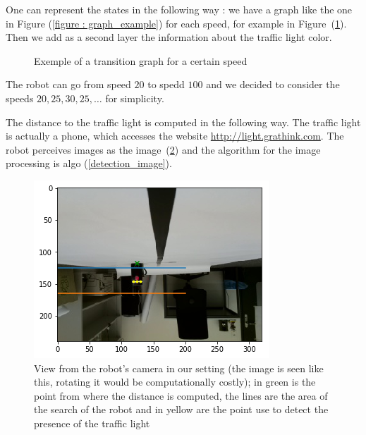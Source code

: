 \documentclass[14pt,a4paper]{article}
\theoremstyle{definition}
\begin{document}
One can represent the states in the following way : we have a graph like the one in Figure  (\ref{figure : graph_example}) for each speed, for example in Figure~(\ref{figure : graph_ex}). Then we add as a second layer the information about the traffic light color.
\begin{figure}[H]
\begin{center}
\end{center}
    \caption{Exemple of a transition graph for a certain speed}
    \label{figure : graph_ex}

\end{figure}


The robot can go from speed $20$ to spedd $100$  and we decided to consider the speeds $20,25,30,25,\ldots$ for simplicity.

The distance to the traffic light is computed in the following way. The traffic light is actually a phone, which accesses the website \url{http://light.grathink.com}. The robot perceives images as the image~(\ref{vue_robot}) and the algorithm for the image processing is algo (\ref{detection_image}).

\begin{figure}
\centering
\captionsetup{justification=centering,margin=2cm}
\includegraphics[scale=0.7]{img/vue10.png}
\caption{View from the robot's camera in our setting (the image is seen like this, rotating it would be computationally costly); in green is the point from where the distance is computed, the lines are the area of the search of the robot and in yellow are the point use to detect the presence of the traffic light}
\label{vue_robot}
\end{figure}
\end{document}
